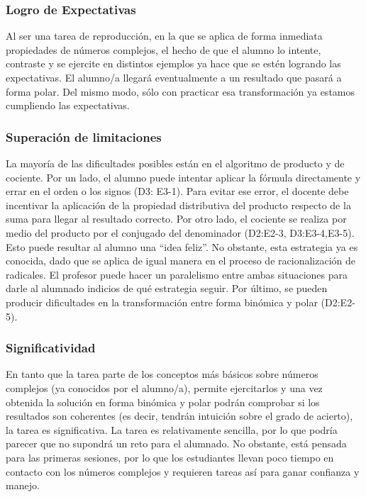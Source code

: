 \documentclass[../main.tex]{memoir}
\begin{document}
\subsubsection{Logro de Expectativas}
Al ser una tarea de reproducción, en la que se aplica de forma inmediata propiedades de números complejos, el hecho de que el alumno lo intente, contraste y se ejercite en distintos ejemplos ya hace que se estén logrando las expectativas. El alumno/a llegará eventualmente a un resultado que pasará a forma polar. Del mismo modo, sólo con practicar esa transformación ya estamos cumpliendo las expectativas. 

\subsubsection{Superación de limitaciones}
La mayoría de las dificultades posibles están en el algoritmo de producto y de cociente. Por un lado, el alumno puede intentar aplicar la fórmula directamente y errar en el orden o los signos (D3: E3-1). Para evitar ese error, el docente debe incentivar la aplicación de la propiedad distributiva del producto respecto de la suma para llegar al resultado correcto. Por otro lado, el cociente se realiza por medio del producto por el conjugado del denominador (D2:E2-3, D3:E3-4,E3-5). Esto puede resultar al alumno una ``idea feliz''. No obstante, esta estrategia ya es conocida, dado que se aplica de igual manera en el proceso de racionalización de radicales. El profesor puede hacer un paralelismo entre ambas situaciones para darle al alumnado indicios de qué estrategia seguir. Por último, se pueden producir dificultades en la transformación entre forma binómica y polar (D2:E2-5).

\subsubsection{Significatividad}
En tanto que la tarea parte de los conceptos más básicos sobre números complejos (ya conocidos por el alumno/a), permite ejercitarlos y una vez obtenida la solución en forma binómica y polar podrán comprobar si los resultados son coherentes (es decir, tendrán intuición sobre el grado de acierto), la tarea es significativa. La tarea es relativamente sencilla, por lo que podría parecer que no supondrá un reto para el alumnado. No obstante, está pensada para las primeras sesiones, por lo que los estudiantes llevan poco tiempo en contacto con los números complejos y requieren tareas así para ganar confianza y manejo.
\end{document}
